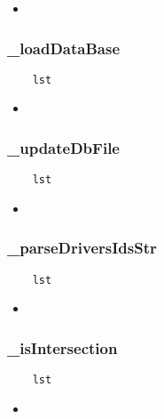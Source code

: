 \begin{itemize}
    \item \verb||
\end{itemize}

\subsubsection{\_loadDataBase}

\begin{lstlisting}
    lst
\end{lstlisting}

\begin{itemize}
    \item \verb||
\end{itemize}

\subsubsection{\_updateDbFile}

\begin{lstlisting}
    lst
\end{lstlisting}

\begin{itemize}
    \item \verb||
\end{itemize}

\subsubsection{\_parseDriversIdsStr}

\begin{lstlisting}
    lst
\end{lstlisting}

\begin{itemize}
    \item \verb||
\end{itemize}

\subsubsection{\_isIntersection}

\begin{lstlisting}
    lst
\end{lstlisting}

\begin{itemize}
    \item \verb||
\end{itemize}

